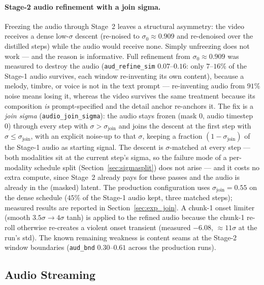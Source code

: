 \documentclass[12pt]{article}
\begin{document}
\paragraph{Stage-2 audio refinement with a join sigma.}
\label{sec:s2audiorefine}
Freezing the audio through Stage~2 leaves a structural asymmetry: the video
receives a dense low-$\sigma$ descent (re-noised to $\sigma_0\approx0.909$
and re-denoised over the distilled steps) while the audio would receive none.
Simply unfreezing does not work --- and the reason is informative.  Full
refinement from $\sigma_0\approx0.909$ was measured to destroy the audio
(\texttt{aud\_refine\_sim} $0.07$--$0.16$: only $7$--$16\%$ of the Stage-1
audio survives, each window re-inventing its own content), because a melody,
timbre, or voice is not in the text prompt --- re-inventing audio from $91\%$
noise means losing it, whereas the video survives the same treatment because
its composition \emph{is} prompt-specified and the detail anchor re-anchors
it.  The fix is a \emph{join sigma} (\texttt{audio\_join\_sigma}): the audio
stays frozen (mask 0, audio timestep 0) through every step with
$\sigma > \sigma_{\text{join}}$ and joins the descent at the first step with
$\sigma \le \sigma_{\text{join}}$, with an explicit noise-up to that
$\sigma$, keeping a fraction $(1-\sigma_{\text{join}})$ of the Stage-1 audio
as starting signal.  The descent is $\sigma$-matched at every step --- both
modalities sit at the current step's sigma, so the failure mode of a
per-modality schedule split (Section~\ref{sec:sigmasplit}) does not arise ---
and it costs no extra compute, since Stage~2 already pays for these passes
and the audio is already in the (masked) latent.  The production
configuration uses $\sigma_{\text{join}}=0.55$ on the dense schedule ($45\%$
of the Stage-1 audio kept, three matched steps); measured results are
reported in Section~\ref{sec:exp_join}.  A chunk-1 onset limiter (smooth
$3.5\sigma\to4\sigma$ tanh) is applied to the refined audio because the
chunk-1 re-roll otherwise re-creates a violent onset transient (measured
$-6.08$, $\approx11\sigma$ at the run's std).  The known remaining weakness
is content seams at the Stage-2 window boundaries (\texttt{aud\_bnd}
$0.30$--$0.61$ across the production runs).

\subsection{Audio Streaming}
\label{sec:audio}
\end{document}
